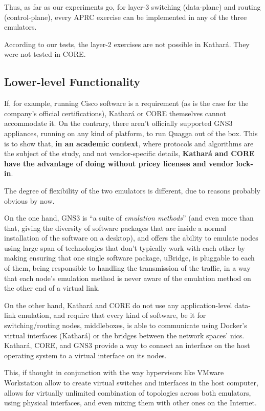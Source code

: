 Thus, as far as our experiments go, for layer-3 switching (data-plane) and routing (control-plane), every APRC exercise can be implemented in any of the three emulators.

According to our tests, the layer-2 exercises are not possible in Kathará.
They were not tested in CORE.

\subsection{Lower-level Functionality}

If, for example, running Cisco software is a requirement (as is the case for the company's official certifications), Kathará or CORE themselves cannot accommodate it.
On the contrary, there aren't officially supported GNS3 appliances, running on any kind of platform, to run Quagga out of the box.
This is to show that, \textbf{in an academic context}, where protocols and algorithms are the subject of the study, and not vendor-specific details, \textbf{Kathará and CORE have the advantage of doing without pricey licenses and vendor lock-in}.

The degree of flexibility of the two emulators is different, due to reasons probably obvious by now.

On the one hand, GNS3 is ``a suite of \emph{emulation methods}'' (and even more than that, giving the diversity of software packages that are inside a normal installation of the software on a desktop), and offers the ability to emulate nodes using large span of technologies that don't typically work with each other by making ensuring that one single software package, uBridge, is pluggable to each of them, being responsible to handling the transmission of the traffic, in a way that each node's emulation method is never aware of the emulation method on the other end of a virtual link.

On the other hand, Kathará and CORE do not use any application-level data-link emulation, and require that every kind of software, be it for switching/routing nodes, middleboxes, is able to communicate using Docker's virtual interfaces (Kathará) or the bridges between the network spaces' \glspl{nic}.
Kathará, CORE, and GNS3 provide a way to connect an interface on the host operating system to a virtual interface on its nodes.

This, if thought in conjunction with the way hypervisors like VMware Workstation allow to create virtual switches and interfaces in the host computer, allows for virtually unlimited combination of topologies across both emulators, using physical interfaces, and even mixing them with other ones on the Internet.

